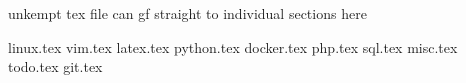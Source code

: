 unkempt tex file can gf straight to individual sections here

linux.tex
vim.tex
latex.tex
python.tex
docker.tex
php.tex
sql.tex
misc.tex
todo.tex
git.tex
